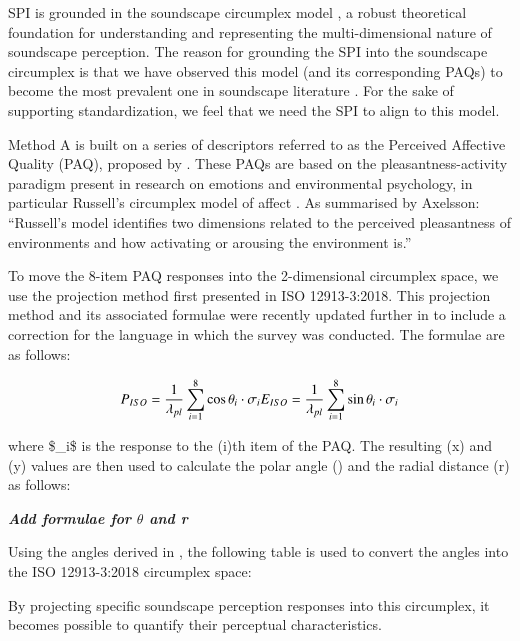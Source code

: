 \documentclass[
  authoryear,
  preprint,
  3p]{elsarticle}
\begin{document}
SPI is grounded in the soundscape circumplex model
\citep{Axelsson2010principal, Axelsson2012Swedish}, a robust theoretical
foundation for understanding and representing the multi-dimensional
nature of soundscape perception. The reason for grounding the SPI into
the soundscape circumplex is that we have observed this model (and its
corresponding PAQs) to become the most prevalent one in soundscape
literature \citep{Aletta2023Adoption}. For the sake of supporting
standardization, we feel that we need the SPI to align to this model.

Method A is built on a series of descriptors referred to as the
Perceived Affective Quality (PAQ), proposed by
\citep{Axelsson2010principal}. These PAQs are based on the
pleasantness-activity paradigm present in research on emotions and
environmental psychology, in particular Russell's circumplex model of
affect \citep{Russell1980circumplex}. As summarised by Axelsson:
``Russell's model identifies two dimensions related to the perceived
pleasantness of environments and how activating or arousing the
environment is.''

To move the 8-item PAQ responses into the 2-dimensional circumplex
space, we use the projection method first presented in ISO 12913-3:2018.
This projection method and its associated formulae were recently updated
further in \citet{Aletta2024} to include a correction for the language
in which the survey was conducted. The formulae are as follows:

\[
P_{ISO} = \frac{1}{\lambda_{pl}} \sum_{i=1}^{8} \cos \theta_i \cdot \sigma_i \\
E_{ISO} = \frac{1}{\lambda_{pl}} \sum_{i=1}^{8} \sin \theta_i \cdot \sigma_i 
\]

where \$\_i\$ is the response to the (i)th item of the PAQ.
The resulting (x) and (y) values are then used to calculate the polar
angle (\theta) and the radial distance (r) as follows:

\textbf{\emph{Add formulae for \(\theta\) and r}}

Using the angles derived in \citet{Aletta2024}, the following table is
used to convert the angles into the ISO 12913-3:2018 circumplex space:

By projecting specific soundscape perception responses into this
circumplex, it becomes possible to quantify their perceptual
characteristics.
\end{document}
